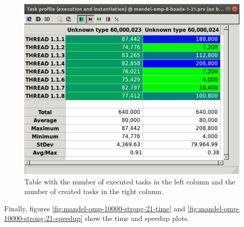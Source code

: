 \documentclass[12pt, a4paper]{article}
\begin{document}
\begin{figure}[H]
	\centering
	\includegraphics[scale=0.40]{./S2_OMP_tasks_table}
	\caption{Table with the number of executed tasks in the left column and the number of created tasks in the right column.}
	\label{fig:S2_OMP_tasks_table}
\end{figure}

Finally, figures \ref{fig:mandel-omp-10000-strong-21-time} and \ref{fig:mandel-omp-10000-strong-21-speedup} show the time and speedup plots.
\end{document}
